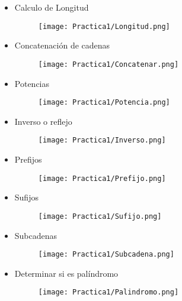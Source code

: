 \documentclass[12pt]{article}
\begin{document}
	\begin{itemize}

		\item Calculo de Longitud

		\begin{figure}[H]
	        \centering
	        \texttt{[image: Practica1/Longitud.png]}
	    \end{figure}
		
		\item Concatenación de cadenas

		\begin{figure}[H]
	        \centering
	        \texttt{[image: Practica1/Concatenar.png]}
	    \end{figure}
	\newpage

		\item Potencias

		\begin{figure}[H]
	        \centering
	        \texttt{[image: Practica1/Potencia.png]}
	    \end{figure}

		\item Inverso o reflejo

		\begin{figure}[H]
	        \centering
	        \texttt{[image: Practica1/Inverso.png]}
	    \end{figure}
	\newpage

		\item Prefijos

		\begin{figure}[H]
	        \centering
	        \texttt{[image: Practica1/Prefijo.png]}
	    \end{figure}
	\newpage

		\item Sufijos
		
		\begin{figure}[H]
	        \centering
	        \texttt{[image: Practica1/Sufijo.png]}
	    \end{figure}
	\newpage

		\item Subcadenas

		\begin{figure}[H]
	        \centering
	        \texttt{[image: Practica1/Subcadena.png]}
	    \end{figure}
	\newpage
	    \item Determinar si es palíndromo
		\begin{figure}[H]
	        \centering
	        \texttt{[image: Practica1/Palindromo.png]}
	    \end{figure}
	\end{itemize}
	\newpage
\end{document}
